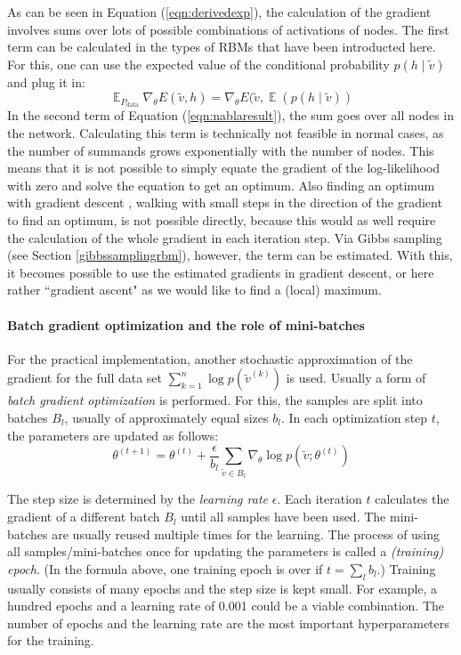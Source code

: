 \documentclass[12pt]{article}
\DeclareMathOperator{\EX}{\mathbb{E}}
\begin{document}
As can be seen in Equation (\ref{eqn:derivedexp}), the calculation of the gradient involves sums over lots of possible combinations of activations of nodes.
The first term can be calculated in the types of RBMs that have been introducted here.
For this, one can use the expected value of the conditional probability $p(h\mid\tilde{v})$ and plug it in:
\begin{equation}
\EX_{P_\text{data}} \nabla_{\!\theta} E(\tilde{v},h) =  \nabla_{\!\theta} E(\tilde{v}, \EX(p(h \mid \tilde{v}))
\label{eqn:plugexpectedh}
\end{equation}
In the second term of Equation (\ref{eqn:nablaresult}), the sum goes over all nodes in the network.
Calculating this term is technically not feasible in normal cases, as the number of summands grows exponentially with the number of nodes.
This means that it is not possible to simply equate the gradient of the log-likelihood with zero and solve the equation to get an optimum. Also finding an optimum with gradient descent \citep{gradientdescent}, walking with small steps in the direction of the gradient to find an optimum, is not possible directly, because this would as well require the calculation of the whole gradient in each iteration step.
Via Gibbs sampling (see Section \ref{gibbssamplingrbm}), however, the term can be estimated.
With this, it becomes possible to use the estimated gradients in gradient descent, or here rather ``gradient ascent" as we would like to find a (local) maximum.

\paragraph{Batch gradient optimization and the role of mini-batches}

For the practical implementation, another stochastic approximation of the gradient for the full data set $\sum_{k=1}^n \log p(\tilde{v}^{(k)})$ is used.
Usually a form of {\em batch gradient optimization} \citep{bottou_optimization_2018} is performed.
For this, the samples are split into batches $B_l$, usually of approximately equal sizes $b_l$.
In each optimization step $t$, the parameters are updated as follows:
\[
\theta^{(t+1)} = \theta^{(t)} + \frac{\epsilon}{b_l} \sum_{\tilde{v} \in B_l} \nabla_{\!\theta} \log p ( \tilde{v}; \theta^{(t)}) 
\]

The step size is determined by the {\em learning rate} $\epsilon$.
Each iteration $t$ calculates the gradient of a different batch $B_l$ until all samples have been used.
The mini-batches are usually reused multiple times for the learning.
The process of using all samples/mini-batches once for updating the parameters is called a {\em (training) epoch}.
(In the formula above, one training epoch is over if $t = \sum_l b_l$.)
Training usually consists of many epochs and the step size is kept small.
For example, a hundred epochs and a learning rate of 0.001 could be a viable combination.
The number of epochs and the learning rate are the most important hyperparameters for the training.
\end{document}
